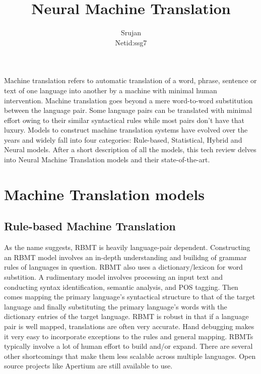 \documentclass[twocolumn,10pt]{article}
\title{Neural Machine Translation}
\author{Srujan \\Netid:ssg7}
\begin{document}
\maketitle

Machine translation refers to automatic translation of a word, phrase, sentence or text of one language into another by a machine with minimal human intervention. Machine translation goes beyond a mere word-to-word substitution between the language pair. Some language pairs can be translated with minimal effort owing to their similar syntactical rules while most pairs don't have that luxury. Models to construct machine translation systems have evolved over the years and widely fall into four categories: Rule-based, Statistical, Hybrid and Neural models. After a short description of all the models, this tech review delves into Neural Machine Translation models and their state-of-the-art. 

\section{Machine Translation models}
\subsection{Rule-based Machine Translation}
As the name suggests, RBMT is heavily language-pair dependent. Constructing an RBMT model involves an in-depth understanding and builidng of grammar rules of languages in question. RBMT also uses a dictionary/lexicon for word substition. A rudimentary model involves processing an input text and conducting syntax identification, semantic analysis, and POS tagging. Then comes mapping the primary language's syntactical structure to that of the target language and finally substituting the primary language's words with the dictionary entries of the target language. RBMT is robust in that if a language pair is well mapped, translations are often very accurate. Hand debugging makes it very easy to incorporate exceptions to the rules and general mapping. RBMTs typically involve a lot of human effort to build and/or expand. There are several other shortcomings that make them less scalable across multiple languages. Open source projects like Apertium\cite{apertium} are still available to use.  
\end{document}
